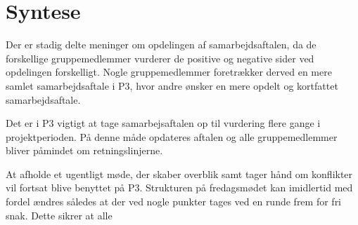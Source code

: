 \section{Syntese}
Der er stadig delte meninger om opdelingen af samarbejdsaftalen, da de forskellige gruppemedlemmer vurderer de positive og negative sider ved opdelingen forskelligt. Nogle gruppemedlemmer foretrækker derved en mere samlet samarbejdsaftale i P3, hvor andre ønsker en mere opdelt og kortfattet samarbejdsaftale.

Det er i P3 vigtigt at tage samarbejsaftalen op til vurdering flere gange i projektperioden. På denne måde opdateres aftalen og alle gruppemedlemmer bliver påmindet om retningslinjerne. 

At afholde et ugentligt møde, der skaber overblik samt tager hånd om konflikter vil fortsat blive benyttet på P3. Strukturen på fredagsmødet kan imidlertid med fordel ændres således at der ved nogle punkter tages ved en runde frem for fri snak. Dette sikrer at alle 